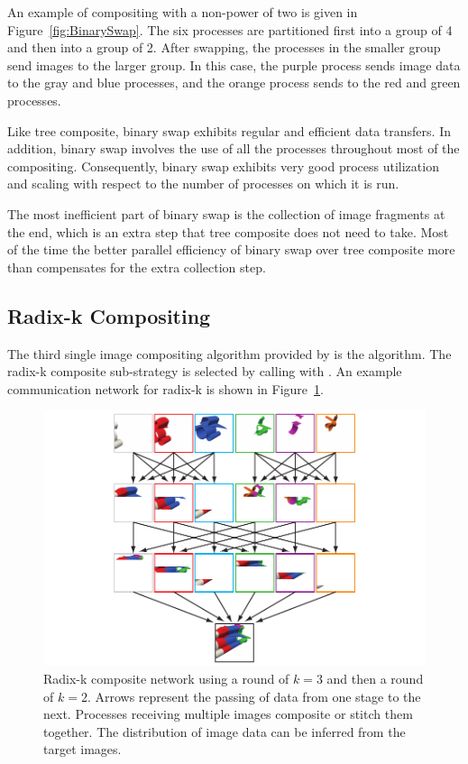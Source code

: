 An example of compositing with a non-power of two is given in
Figure~\ref{fig:BinarySwap}.  The six processes are partitioned first into
a group of 4 and then into a group of 2.  After swapping, the processes in
the smaller group send images to the larger group.  In this case, the purple
process sends image data to the gray and blue processes, and the orange
process sends to the red and green processes.

Like tree composite, binary swap exhibits regular and efficient data
transfers.  In addition, binary swap involves the use of all the processes
throughout most of the compositing.  Consequently, binary swap exhibits
very good process utilization and scaling with respect to the number of
processes on which it is run.

The most inefficient part of binary swap is the collection of image
fragments at the end, which is an extra step that tree composite does not
need to take.  Most of the time the better parallel efficiency of binary
swap over tree composite more than compensates for the extra collection
step.


\subsection{Radix-k Compositing}
\label{sec:Strategies:Radix-k}


The third single image compositing algorithm provided by \IceT is the
 algorithm.  The radix-k composite sub-strategy is
selected by calling  with
.  An example communication
network for radix-k is shown in Figure~\ref{fig:RadixK}.

\begin{figure}
  \centering
  \includegraphics{images/RadixK}
  \caption[Radix-k composite network.]{Radix-k composite network using a
    round of $k=3$ and then a round of $k=2$.  Arrows represent the passing
    of data from one stage to the next.  Processes receiving multiple
    images composite or stitch them together.  The distribution of image
    data can be inferred from the target images.}
  \label{fig:RadixK}
\end{figure}

